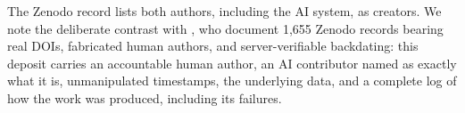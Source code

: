 The Zenodo record lists both authors, including the AI system, as creators. We note the
deliberate contrast with \citet{brzozowski2026ghost}, who document 1{,}655 Zenodo records
bearing real DOIs, fabricated human authors, and server-verifiable backdating: this deposit
carries an accountable human author, an AI contributor named as exactly what it is,
unmanipulated timestamps, the underlying data, and a complete log of how the work was
produced, including its failures.

